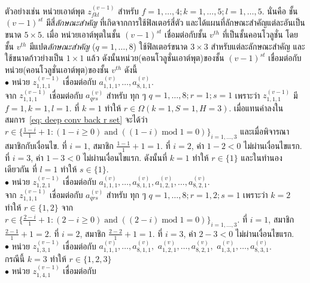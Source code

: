 ตัวอย่างเช่น
หน่วยเอาต์พุต $z_{fkl}^{(v-1)}$ สำหรับ 
$f=1,\ldots,4; k=1,\ldots,5; l=1,\ldots,5$.
นั่นคือ ชั้น $(v-1)^{st}$ มีสี่\textit{ลักษณะสำคัญ} ที่เกิดจากการใช้ฟิลเตอร์สี่ตัว
และได้แผนที่ลักษณะสำคัญแต่ละอันเป็นขนาด $5 \times 5$. 
เมื่อ หน่วยเอาต์พุตในชั้น $(v-1)^{st}$ เชื่อมต่อกับชั้น $v^{th}$ ที่เป็นชั้นคอนโวลูชั่น
โดยชั้น $v^{th}$ มีแปด\textit{ลักษณะสำคัญ} ($q = 1, \ldots, 8$)
ใช้ฟิลเตอร์ขนาด $3 \times 3$ สำหรับแต่ละลักษณะสำคัญ
และใช้ขนาดก้าวย่างเป็น $1 \times 1$
แล้ว
ดังนั้นหน่วย(คอนโวลูชั่นเอาต์พุต)ของชั้น $(v-1)^{st}$ เชื่อมต่อกับหน่วย(คอนโวลูชั่นเอาต์พุต)ของชั้น $v^{th}$ ดังนี้ \\
%
$\bullet$\;\; หน่วย $z_{1,1,1}^{(v-1)}$ เชื่อมต่อกับ 
$a_{1,1,1}^{(v)}, \ldots, a_{8,1,1}^{(v)}$. \\
จาก $z_{1,1,1}^{(v-1)}$ เชื่อมต่อกับ $a_{qrs}^{(v)}$ สำหรับ ทุก ๆ $q = 1,\ldots, 8; r = 1; s = 1$
เพราะว่า
$z_{1,1,1}^{(v-1)}$ มี $f = 1, k = 1, l = 1$.
ที่ $k = 1$ ทำให้
$r \in \Omega(k=1, S=1, H=3)$.
เมื่อแทนค่าลงในสมการ~\ref{eq: deep conv back r set} จะได้ว่า
$ r \in \{\frac{1 - i}{1} + 1: (1 - i \geq 0) \;\mathrm{and}\; ( (1 - i) \;\mathrm{mod}\; 1 = 0) \}_{i = 1, \ldots, 3}$
และเมื่อพิจารณาสมาชิกกับเงื่อนไข.
ที่ $i = 1$, สมาชิก $\frac{1 - 1}{1} + 1 = 1$. 
ที่ $i = 2$, ค่า $1 - 2 < 0$ ไม่ผ่านเงื่อนไขแรก. 
ที่ $i = 3$, ค่า $1 - 3 < 0$ ไม่ผ่านเงื่อนไขแรก.
ดังนั้นที่ $k = 1$ ทำให้ $r \in \{1\}$
และในทำนองเดียวกัน ที่ $l = 1$ ทำให้ $s \in \{1\}$. \\
%
$\bullet$\;\; หน่วย $z_{1,2,1}^{(v-1)}$ เชื่อมต่อกับ 
$a_{1,1,1}^{(v)}, \ldots, a_{8,1,1}^{(v)}, a_{1,2,1}^{(v)}, \ldots, a_{8,2,1}^{(v)}$. \\
จาก $z_{1,1,1}^{(v-1)}$ เชื่อมต่อกับ $a_{qrs}^{(v)}$ สำหรับ ทุก ๆ $q = 1,\ldots, 8; r = 1, 2; s = 1$
เพราะว่า
$k = 2$ ทำให้ $r \in \{1, 2\}$ 
จาก 
$r \in \{\frac{2 - i}{1} + 1: (2 - i \geq 0) \;\mathrm{and}\; ( (2 - i) \;\mathrm{mod}\; 1 = 0) \}_{i = 1, \ldots, 3}$.
ที่ $i = 1$, สมาชิก $\frac{2 - 1}{1} + 1 = 2$.
ที่ $i = 2$, สมาชิก $\frac{2 - 2}{1} + 1 = 1$.
ที่ $i = 3$, ค่า $2 - 3 < 0$ ไม่ผ่านเงื่อนไขแรก. \\
%
$\bullet$\;\; หน่วย $z_{1,3,1}^{(v-1)}$ เชื่อมต่อกับ 
$a_{1,1,1}^{(v)}, \ldots, a_{8,1,1}^{(v)},$ 
$a_{1,2,1}^{(v)}, \ldots, a_{8,2,1}^{(v)},$ 
$a_{1,3,1}^{(v)}, \ldots, a_{8,3,1}^{(v)}$. \\
กรณีนี้ $k = 3$ ทำให้ $r \in \{1, 2, 3\}$ 
\\
%
$\bullet$\;\; หน่วย $z_{1,4,1}^{(v-1)}$ เชื่อมต่อกับ 

